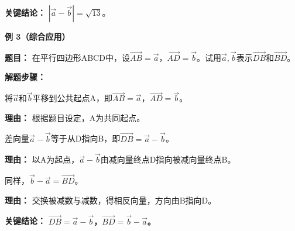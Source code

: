 \begin{examplebox}
	\textbf{\textcolor{CExample}{关键结论：}}
	\textbf{$|\vec{a}-\vec{b}|=\sqrt{13}$}。

	\medskip
	\textbf{\textcolor{CExample}{例 3（综合应用）}}

	\textbf{\textcolor{CExample}{题目：}}
	在平行四边形ABCD中，设$\overrightarrow{AB}=\vec{a}$，$\overrightarrow{AD}=\vec{b}$。试用$\vec{a},\vec{b}$表示$\overrightarrow{DB}$和$\overrightarrow{BD}$。

	\textbf{\textcolor{CExample}{解题步骤：}}
	\begin{description}[style=nextline, leftmargin=2.8em, labelsep=0.5em, itemsep=0.45em]
		\item[\textbf{第一步（平移共起点）：}] 将$\vec{a}$和$\vec{b}$平移到公共起点A，即$\overrightarrow{AB}=\vec{a}$，$\overrightarrow{AD}=\vec{b}$。
			\par\textbf{理由：}
			根据题目设定，A为共同起点。
		\item[\textbf{第二步（应用减法法则）：}] 差向量$\vec{a}-\vec{b}$等于从D指向B，即$\overrightarrow{DB}=\vec{a}-\vec{b}$。
			\par\textbf{理由：}
			以A为起点，$\vec{a}-\vec{b}$由减向量终点D指向被减向量终点B。
		\item[\textbf{第三步（交换顺序）：}] 同样，$\vec{b}-\vec{a}=\overrightarrow{BD}$。
			\par\textbf{理由：}
			交换被减数与减数，得相反向量，方向由B指向D。
	\end{description}

	\textbf{\textcolor{CExample}{关键结论：}}
	\textbf{$\overrightarrow{DB}=\vec{a}-\vec{b}$，$\overrightarrow{BD}=\vec{b}-\vec{a}$。}
\end{examplebox}
